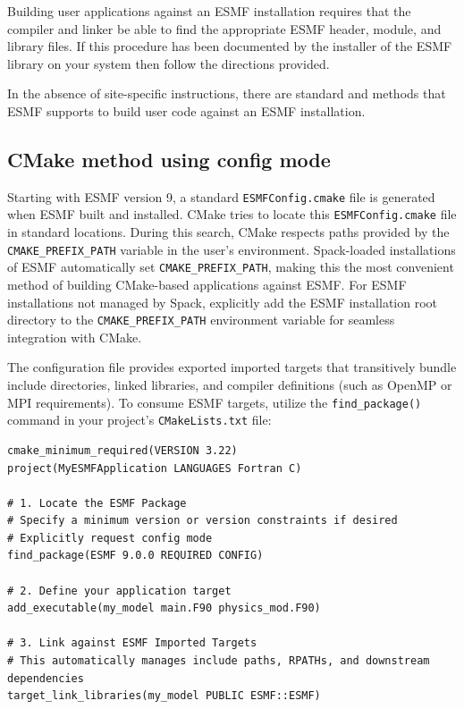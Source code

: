 
Building user applications against an ESMF installation requires that the
compiler and linker be able to find the appropriate ESMF header, module, and
library files. If this procedure has been documented by the installer of the
ESMF library on your system then follow the directions provided.

In the absence of site-specific instructions, there are standard
 and
methods that ESMF supports to build user code against an ESMF installation.

\subsection{CMake method using config mode}

Starting with ESMF version 9, a standard {\tt ESMFConfig.cmake} file is generated
when ESMF built and installed. CMake tries to locate this {\tt ESMFConfig.cmake} file
in standard locations. During this search, CMake respects
paths provided by the {\tt CMAKE\_PREFIX\_PATH} variable in the user's environment. Spack-loaded
installations of ESMF automatically set {\tt CMAKE\_PREFIX\_PATH}, making this the
most convenient method of building CMake-based applications against ESMF.
For ESMF installations not managed by Spack, explicitly add the ESMF
installation root directory to the {\tt CMAKE\_PREFIX\_PATH} environment variable
for seamless integration with CMake.

The configuration file provides exported imported targets that transitively bundle include directories, linked libraries, and compiler definitions (such as OpenMP or MPI requirements). To consume ESMF targets, utilize the \texttt{find\_package()} command in your project's \texttt{CMakeLists.txt} file:

\begin{verbatim}
cmake_minimum_required(VERSION 3.22)
project(MyESMFApplication LANGUAGES Fortran C)

# 1. Locate the ESMF Package
# Specify a minimum version or version constraints if desired
# Explicitly request config mode
find_package(ESMF 9.0.0 REQUIRED CONFIG)

# 2. Define your application target
add_executable(my_model main.F90 physics_mod.F90)

# 3. Link against ESMF Imported Targets
# This automatically manages include paths, RPATHs, and downstream dependencies
target_link_libraries(my_model PUBLIC ESMF::ESMF)
\end{verbatim}

